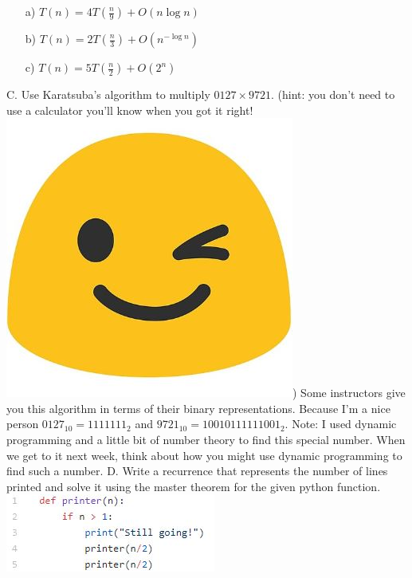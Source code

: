\documentclass[12pt]{article}
\begin{document}
\begin{enumerate}
    \item[a)]$T(n) = 4T(\frac{n}{9}) + O(n \log{n})$
    \item[b)]$T(n) = 2T(\frac{n}{3}) + O(n^{-\log{n}})$
    \item[c)]$T(n) = 5T(\frac{n}{2}) + O(2^n)$
\end{enumerate}
\newpage
\noindent C. Use Karatsuba's algorithm to multiply $0127\times9721$. (hint: you don't need to use a calculator you'll know when you got it right! \includegraphics[scale = 0.05]{wink.jpg})
Some instructors give you this algorithm in terms of their binary representations. Because I'm a nice person
$0127_{10}=1111111_2$ and $9721_{10}=10010111111001_2$. Note: I used dynamic programming and a little bit of number
theory to find this special number. When we get to it next week, think about how you might use dynamic programming to
find such a number.
\newpage
\noindent D. Write a recurrence that represents the number of lines printed and solve it using the master theorem for the given python function.\\
\includegraphics{printer.jpg}\\\\\\\\\\\\\\\
\end{document}
